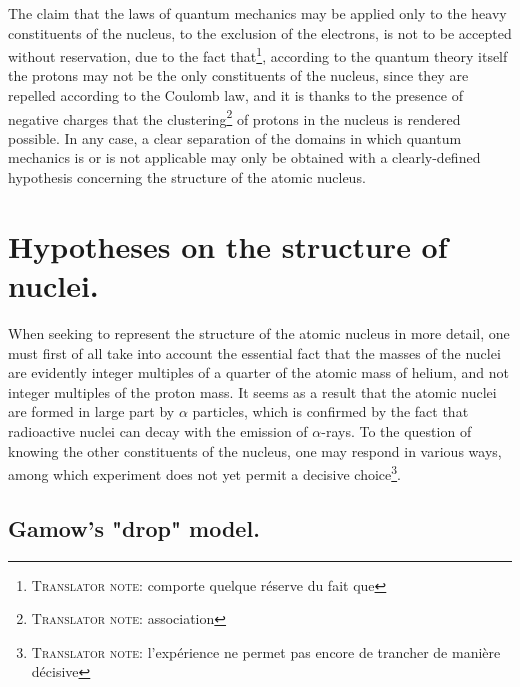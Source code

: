 \documentclass[a4paper,11pt]{article}
\newcommand{\?}[2]{#1\footnote{\textsc{Translator note}: #2}}
\begin{document}
The claim that the laws of quantum mechanics may be applied only to the heavy constituents of the nucleus, to the exclusion of the electrons, \?{is not to be accepted without reservation, due to the fact that}{comporte quelque réserve du fait que}, according to the quantum theory itself the protons may not be the only constituents of the nucleus, since they are repelled according to the Coulomb law, and it is thanks to the presence of negative charges that the \?{clustering}{association} of protons in the nucleus is rendered possible. In any case, a clear separation of the domains in which quantum mechanics is or is not applicable may only be obtained with a clearly-defined hypothesis concerning the structure of the atomic nucleus.


\section{Hypotheses on the structure of nuclei.}

When seeking to represent the structure of the atomic nucleus in more detail, one must first of all take into account the essential fact that the masses of the nuclei are evidently integer multiples of a quarter of the atomic mass of helium, and not integer multiples of the proton mass. It seems as a result that the atomic nuclei are formed in large part by $\alpha$ particles, which is confirmed by the fact that radioactive nuclei can decay with the emission of $\alpha$-rays. To the question of knowing the other constituents of the nucleus, one may respond in various ways, among which \?{experiment does not yet permit a decisive choice}{l'expérience ne permet pas encore de trancher de manière décisive}.

\subsection{Gamow's "drop" model.}
\end{document}
